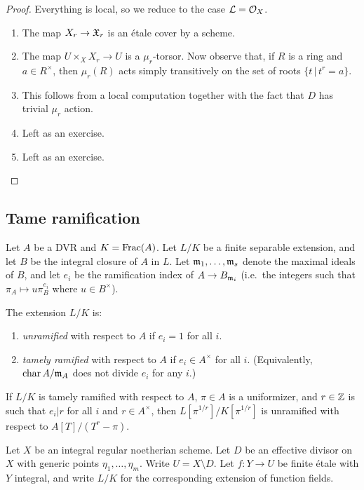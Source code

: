 \documentclass{amsart}
\begin{document}
\begin{proof}
	Everything is local, so we reduce to the case $\mathcal{L} = \mathcal{O}_X$.
	\begin{enumerate}
		\item The map $X_r \to \mathfrak{X}_r$ is an \'etale cover by a scheme.
		\item The map $U \times_X X_r \to U$ is a $\mu_r$-torsor.
			Now observe that, if $R$ is a ring and $a \in R^\times$, then $\mu_r(R)$ acts simply transitively on the set of roots $\{t \,|\, t^r = a\}$.
		\item This follows from a local computation together with the fact that $D$ has trivial $\mu_r$ action.
		\item Left as an exercise.
		\item Left as an exercise. \qedhere
	\end{enumerate}
\end{proof}

\subsection{Tame ramification}

Let $A$ be a DVR and $K = \operatorname{Frac}(A)$.
Let $L / K$ be a finite separable extension, and let $B$ be the integral closure of $A$ in $L$.
Let $\mathfrak{m}_1, \dots, \mathfrak{m}_s$ denote the maximal ideals of $B$, and let $e_i$ be the ramification index of $A \to B_{\mathfrak{m}_i}$ (i.e.\ the integers such that $\pi_A \mapsto u \pi_B^{e_i}$ where $u \in B^\times$).

\begin{dfn}
	The extension $L / K$ is:
	\begin{enumerate}
		\item \emph{unramified} with respect to $A$ if $e_i = 1$ for all $i$.
		\item \emph{tamely ramified} with respect to $A$ if $e_i \in A^\times$ for all $i$.
			(Equivalently, $\operatorname{char} A / \mathfrak{m}_A$ does not divide $e_i$ for any $i$.)
	\end{enumerate}
\end{dfn}

\begin{lem}[Abhyankar]
	If $L / K$ is tamely ramified with respect to $A$, $\pi \in A$ is a uniformizer, and $r \in \mathbb{Z}$ is such that $e_i | r$ for all $i$ and $r \in A^\times$, then $L[\pi^{1/r}] / K[\pi^{1/r}]$ is unramified with respect to $A[T] / (T^r - \pi)$.
\end{lem}

Let $X$ be an integral regular noetherian scheme.
Let $D$ be an effective divisor on $X$ with generic points $\eta_1, \dots, \eta_m$.
Write $U = X \setminus D$.
Let $f: Y \to U$ be finite \'etale with $Y$ integral, and write $L / K$ for the corresponding extension of function fields.
\end{document}
